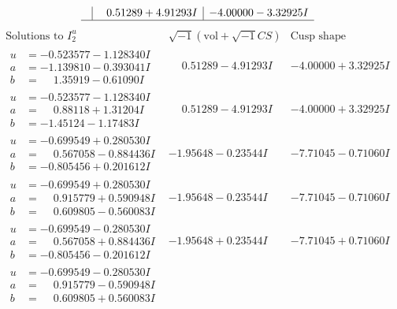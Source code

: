 \documentclass[1p]{elsarticle_modified}
\theoremstyle{definition}
\newcommand{\I}{\sqrt{-1}}
\begin{document}
$$\begin{array}{c|c|c}
 & \phantom{-}0.51289 + 4.91293 I & -4.00000 - 3.32925 I\\
 \hline 
 \end{array}$$\newpage$$\begin{array}{c|c|c}  
\text{Solutions to }I^u_{2}& \I (\text{vol} + \sqrt{-1}CS) & \text{Cusp shape}\\
 \hline 
\begin{aligned}
u &= -0.523577 - 1.128340 I \\
a &= -1.139810 - 0.393041 I \\
b &= \phantom{-}1.35919 - 0.61090 I\end{aligned}
 & \phantom{-}0.51289 - 4.91293 I & -4.00000 + 3.32925 I \\ \hline\begin{aligned}
u &= -0.523577 - 1.128340 I \\
a &= \phantom{-}0.88118 + 1.31204 I \\
b &= -1.45124 - 1.17483 I\end{aligned}
 & \phantom{-}0.51289 - 4.91293 I & -4.00000 + 3.32925 I \\ \hline\begin{aligned}
u &= -0.699549 + 0.280530 I \\
a &= \phantom{-}0.567058 - 0.884436 I \\
b &= -0.805456 + 0.201612 I\end{aligned}
 & -1.95648 - 0.23544 I & -7.71045 - 0.71060 I \\ \hline\begin{aligned}
u &= -0.699549 + 0.280530 I \\
a &= \phantom{-}0.915779 + 0.590948 I \\
b &= \phantom{-}0.609805 - 0.560083 I\end{aligned}
 & -1.95648 - 0.23544 I & -7.71045 - 0.71060 I \\ \hline\begin{aligned}
u &= -0.699549 - 0.280530 I \\
a &= \phantom{-}0.567058 + 0.884436 I \\
b &= -0.805456 - 0.201612 I\end{aligned}
 & -1.95648 + 0.23544 I & -7.71045 + 0.71060 I \\ \hline\begin{aligned}
u &= -0.699549 - 0.280530 I \\
a &= \phantom{-}0.915779 - 0.590948 I \\
b &= \phantom{-}0.609805 + 0.560083 I\end{aligned}

\end{array}$$
\end{document}
